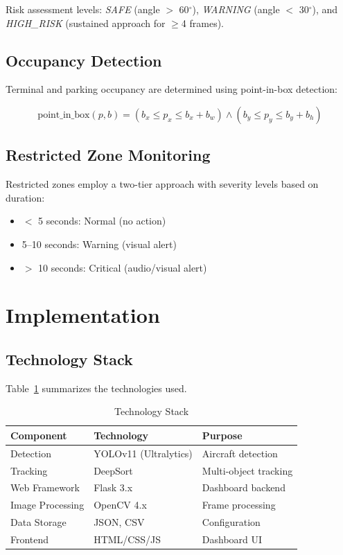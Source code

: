 \documentclass[conference]{IEEEtran}
\begin{document}
Risk assessment levels: \textit{SAFE} (angle $>$ 60$^{\circ}$), \textit{WARNING} (angle $<$ 30$^{\circ}$), and \textit{HIGH\_RISK} (sustained approach for $\geq$4 frames).

\subsection{Occupancy Detection}
Terminal and parking occupancy are determined using point-in-box detection:

\begin{equation}
\text{point\_in\_box}(p, b) = (b_x \leq p_x \leq b_x + b_w) \land (b_y \leq p_y \leq b_y + b_h)
\label{eq:point_in_box}
\end{equation}

\subsection{Restricted Zone Monitoring}
Restricted zones employ a two-tier approach with severity levels based on duration:
\begin{itemize}
    \item $<$ 5 seconds: Normal (no action)
    \item 5--10 seconds: Warning (visual alert)
    \item $>$ 10 seconds: Critical (audio/visual alert)
\end{itemize}

\section{Implementation}
\label{sec:implementation}

\subsection{Technology Stack}
Table~\ref{tab:tech_stack} summarizes the technologies used.

\begin{table}[htbp]
\caption{Technology Stack}
\label{tab:tech_stack}
\begin{center}
\begin{tabular}{|l|l|l|}
\hline
\textbf{Component} & \textbf{Technology} & \textbf{Purpose} \\
\hline
Detection & YOLOv11 (Ultralytics) & Aircraft detection \\
\hline
Tracking & DeepSort & Multi-object tracking \\
\hline
Web Framework & Flask 3.x & Dashboard backend \\
\hline
Image Processing & OpenCV 4.x & Frame processing \\
\hline
Data Storage & JSON, CSV & Configuration \\
\hline
Frontend & HTML/CSS/JS & Dashboard UI \\
\hline
\end{tabular}
\end{center}
\end{table}
\end{document}
